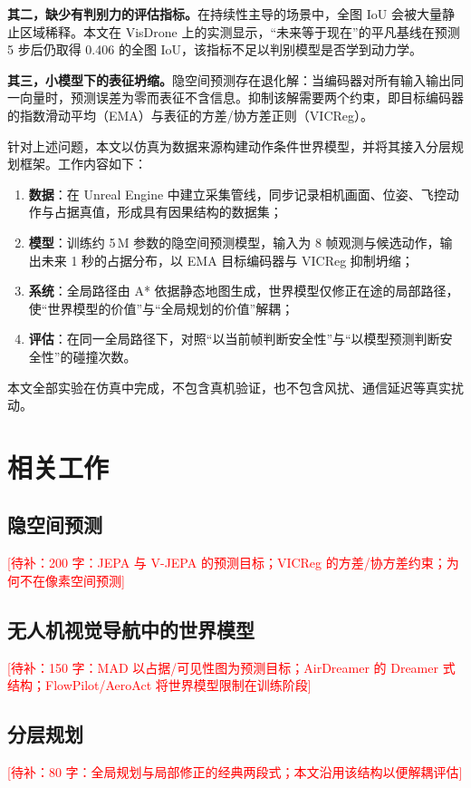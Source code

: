 \documentclass[12pt,a4paper]{ctexart}
\newcommand{\todo}[1]{\textcolor{red}{[待补：#1]}}
\begin{document}
\textbf{其二，缺少有判别力的评估指标。}在持续性主导的场景中，全图 IoU 会被大量静止区域稀释。本文在 VisDrone 上的实测显示，``未来等于现在''的平凡基线在预测 5 步后仍取得 0.406 的全图 IoU，该指标不足以判别模型是否学到动力学。

\textbf{其三，小模型下的表征坍缩。}隐空间预测存在退化解：当编码器对所有输入输出同一向量时，预测误差为零而表征不含信息。抑制该解需要两个约束，即目标编码器的指数滑动平均（EMA）与表征的方差/协方差正则（VICReg）。

针对上述问题，本文以仿真为数据来源构建动作条件世界模型，并将其接入分层规划框架。工作内容如下：

\begin{enumerate}
  \item \textbf{数据}：在 Unreal Engine 中建立采集管线，同步记录相机画面、位姿、飞控动作与占据真值，形成具有因果结构的数据集；
  \item \textbf{模型}：训练约 5\,M 参数的隐空间预测模型，输入为 8 帧观测与候选动作，输出未来 1 秒的占据分布，以 EMA 目标编码器与 VICReg 抑制坍缩；
  \item \textbf{系统}：全局路径由 A* 依据静态地图生成，世界模型仅修正在途的局部路径，使``世界模型的价值''与``全局规划的价值''解耦；
  \item \textbf{评估}：在同一全局路径下，对照``以当前帧判断安全性''与``以模型预测判断安全性''的碰撞次数。
\end{enumerate}

本文全部实验在仿真中完成，不包含真机验证，也不包含风扰、通信延迟等真实扰动。

\section{相关工作}

\subsection{隐空间预测}
\todo{200 字：JEPA 与 V-JEPA 的预测目标；VICReg 的方差/协方差约束；为何不在像素空间预测}

\subsection{无人机视觉导航中的世界模型}
\todo{150 字：MAD 以占据/可见性图为预测目标；AirDreamer 的 Dreamer 式结构；FlowPilot/AeroAct 将世界模型限制在训练阶段}

\subsection{分层规划}
\todo{80 字：全局规划与局部修正的经典两段式；本文沿用该结构以便解耦评估}
\end{document}
